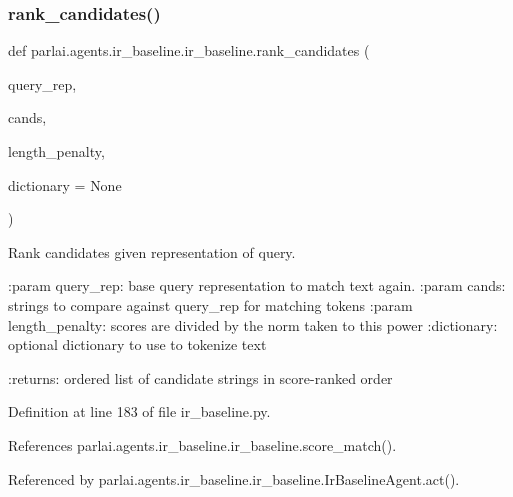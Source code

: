 \subsubsection{\texorpdfstring{rank\+\_\+candidates()}{rank\_candidates()}}
{\footnotesize\ttfamily def parlai.\+agents.\+ir\+\_\+baseline.\+ir\+\_\+baseline.\+rank\+\_\+candidates (\begin{DoxyParamCaption}\item[{}]{query\+\_\+rep,  }\item[{}]{cands,  }\item[{}]{length\+\_\+penalty,  }\item[{}]{dictionary = {\ttfamily None} }\end{DoxyParamCaption})}

\begin{DoxyVerb}Rank candidates given representation of query.

:param query_rep: base query representation to match text again.
:param cands: strings to compare against query_rep for matching tokens
:param length_penalty: scores are divided by the norm taken to this power
:dictionary: optional dictionary to use to tokenize text

:returns: ordered list of candidate strings in score-ranked order
\end{DoxyVerb}
 

Definition at line 183 of file ir\+\_\+baseline.\+py.



References parlai.\+agents.\+ir\+\_\+baseline.\+ir\+\_\+baseline.\+score\+\_\+match().



Referenced by parlai.\+agents.\+ir\+\_\+baseline.\+ir\+\_\+baseline.\+Ir\+Baseline\+Agent.\+act().


